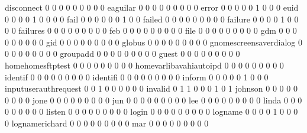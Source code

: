 \documentclass[compress,8pt]{beamer}
\begin{document}
\begin{frame}
\begin{Schunk}
  disconnect                                 0   0   0   0   0   0   0   0   0
  eaguilar                                   0   0   0   0   0   0   0   0   0
  error                                      0   0   0   0   0   1   0   0   0
  euid                                       0   0   0   0   1   0   0   0   0
  fail                                       0   0   0   0   0   0   1   0   0
  failed                                     0   0   0   0   0   0   0   0   0
  failure                                    0   0   0   0   1   0   0   0   0
  failures                                   0   0   0   0   0   0   0   0   0
  feb                                        0   0   0   0   0   0   0   0   0
  file                                       0   0   0   0   0   0   0   0   0
  gdm                                        0   0   0   0   0   0   0   0   0
  gid                                        0   0   0   0   0   0   0   0   0
  globus                                     0   0   0   0   0   0   0   0   0
  gnomescreensaverdialog                     0   0   0   0   0   0   0   0   0
  groupadd                                   0   0   0   0   0   0   0   0   0
  guest                                      0   0   0   0   0   0   0   0   0
  homehomesftptest                           0   0   0   0   0   0   0   0   0
  homevarlibavahiautoipd                     0   0   0   0   0   0   0   0   0
  identif                                    0   0   0   0   0   0   0   0   0
  identifi                                   0   0   0   0   0   0   0   0   0
  inform                                     0   0   0   0   0   1   0   0   0
  inputuserauthrequest                       0   0   1   0   0   0   0   0   0
  invalid                                    0   1   1   0   0   0   1   0   1
  johnson                                    0   0   0   0   0   0   0   0   0
  jone                                       0   0   0   0   0   0   0   0   0
  jun                                        0   0   0   0   0   0   0   0   0
  lee                                        0   0   0   0   0   0   0   0   0
  linda                                      0   0   0   0   0   0   0   0   0
  listen                                     0   0   0   0   0   0   0   0   0
  login                                      0   0   0   0   0   0   0   0   0
  logname                                    0   0   0   0   1   0   0   0   0
  lognamerichard                             0   0   0   0   0   0   0   0   0
  mar                                        0   0   0   0   0   0   0   0   0

\end{Schunk}
\end{frame}
\end{document}
